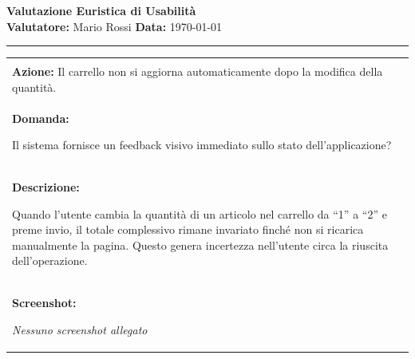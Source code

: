 \documentclass[11pt,a4paper]{article}
\begin{document}
	
	\noindent
	\begin{minipage}{\textwidth}
		{\LARGE \textbf{Valutazione Euristica di Usabilità}} \\[0.5em]
		\textbf{Valutatore:} Mario Rossi \hfill \textbf{Data:} \today
	\end{minipage}
	\vspace{1.5em}
	\hrule
	\vspace{1.5em}
	
	\newcommand{\tabellaProblemi}[6]{
		\noindent
		\begin{tabularx}{\textwidth}{|X|}
			\hline
			\begin{minipage}[t]{\linewidth}\raggedright
				\vspace{4pt}
				\textbf{Problema N\textsuperscript{o}:} #1 \hfill \textbf{Grado di Severità:} #5\\[4pt]
				\textbf{Azione:} #2\\[6pt]
				\textbf{Domanda:} \par
				#3\\[6pt]
				\textbf{Descrizione:} \par
				#4
				\vspace{6pt}
			\end{minipage} \\ \hline
			
			\begin{minipage}[t]{\linewidth}\centering
				\vspace{4pt}
				\textbf{Screenshot:}
				\vspace{0.6em}
				
				#6
				\vspace{6pt}
			\end{minipage} \\ \hline
		\end{tabularx}
		\vspace{1em}
	}

	\tabellaProblemi{
		1 
	}{
		Il carrello non si aggiorna automaticamente dopo la modifica della quantità. 
	}{
		Il sistema fornisce un feedback visivo immediato sullo stato dell'applicazione? 
	}{
		Quando l'utente cambia la quantità di un articolo nel carrello da ``1'' a ``2'' e preme invio, il totale complessivo rimane invariato finché non si ricarica manualmente la pagina. Questo genera incertezza nell'utente circa la riuscita dell'operazione. 
	}{
		3 
	}{
		\textit{Nessuno screenshot allegato} 
	}
	
\end{document}
